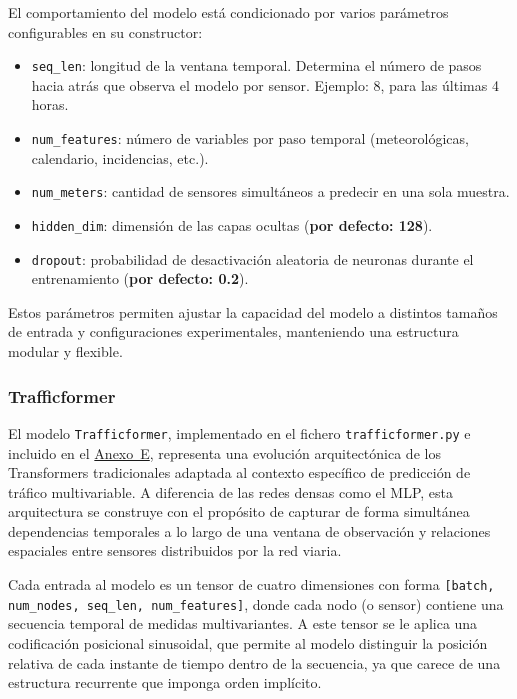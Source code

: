 El comportamiento del modelo está condicionado por varios parámetros configurables en su constructor:

\begin{itemize}
	\item \texttt{seq\_len}: longitud de la ventana temporal. Determina el número de pasos hacia atrás que observa el modelo por sensor. Ejemplo: 8, para las últimas 4 horas.
	\item \texttt{num\_features}: número de variables por paso temporal (meteorológicas, calendario, incidencias, etc.).
	\item \texttt{num\_meters}: cantidad de sensores simultáneos a predecir en una sola muestra.
	\item \texttt{hidden\_dim}: dimensión de las capas ocultas (\textbf{por defecto: 128}).
	\item \texttt{dropout}: probabilidad de desactivación aleatoria de neuronas durante el entrenamiento (\textbf{por defecto: 0.2}).
\end{itemize}

Estos parámetros permiten ajustar la capacidad del modelo a distintos tamaños de entrada y configuraciones experimentales, manteniendo una estructura modular y flexible.

\subsubsection*{Trafficformer}

El modelo \texttt{Trafficformer}, implementado en el fichero \texttt{trafficformer.py} e incluido en el \hyperref[anexo:codigo_trafficformer]{Anexo~E}, representa una evolución arquitectónica de los Transformers tradicionales adaptada al contexto específico de predicción de tráfico multivariable. A diferencia de las redes densas como el MLP, esta arquitectura se construye con el propósito de capturar de forma simultánea dependencias temporales a lo largo de una ventana de observación y relaciones espaciales entre sensores distribuidos por la red viaria.

Cada entrada al modelo es un tensor de cuatro dimensiones con forma \texttt{[batch, num\_nodes, seq\_len, num\_features]}, donde cada nodo (o sensor) contiene una secuencia temporal de medidas multivariantes. A este tensor se le aplica una codificación posicional sinusoidal, que permite al modelo distinguir la posición relativa de cada instante de tiempo dentro de la secuencia, ya que carece de una estructura recurrente que imponga orden implícito.

